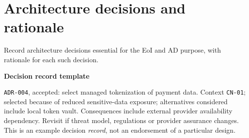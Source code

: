 \documentclass[11pt,letterpaper]{article}
\begin{document}
\section{Architecture decisions and rationale \texorpdfstring{}{(6.10)}}
\begin{Requirement}\FlagReq{} Record architecture decisions essential for the EoI and AD purpose, with rationale for each such decision. \end{Requirement}
\textbf{Decision record template}\par
{}
\begin{Worked}\texttt{ADR-004}, accepted: select managed tokenization of payment data. Context \texttt{CN-01}; selected because of reduced sensitive-data exposure; alternatives considered include local token vault. Consequences include external provider availability dependency. Revisit if threat model, regulations or provider assurance changes. This is an example decision \emph{record}, not an endorsement of a particular design.\end{Worked}
\end{document}
